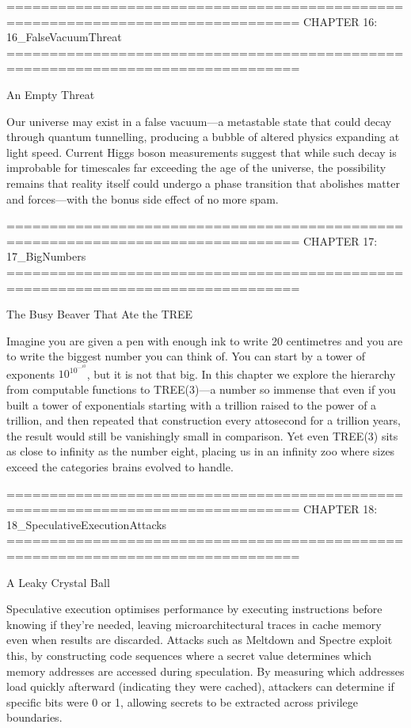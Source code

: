 ================================================================================
CHAPTER 16: 16_FalseVacuumThreat
================================================================================

An Empty Threat

Our universe may exist in a false vacuum—a metastable state that could decay through quantum tunnelling, producing a bubble of altered physics expanding at light speed. Current Higgs boson measurements suggest that while such decay is improbable for timescales far exceeding the age of the universe, the possibility remains that reality itself could undergo a phase transition that abolishes matter and forces—with the bonus side effect of no more spam.


================================================================================
CHAPTER 17: 17_BigNumbers
================================================================================

The Busy Beaver That Ate the TREE

Imagine you are given a pen with enough ink to write 20 centimetres and you are to write the biggest number you can think of. You can start by a tower of exponents $10^{10^{\cdots^{10}}}$, but it is not that big. In this chapter we explore the hierarchy from computable functions to TREE(3)—a number so immense that even if you built a tower of exponentials starting with a trillion raised to the power of a trillion, and then repeated that construction every attosecond for a trillion years, the result would still be vanishingly small in comparison. Yet even TREE(3) sits as close to infinity as the number eight, placing us in an infinity zoo where sizes exceed the categories brains evolved to handle.


================================================================================
CHAPTER 18: 18_SpeculativeExecutionAttacks
================================================================================

A Leaky Crystal Ball

Speculative execution optimises performance by executing instructions before knowing if they're needed, leaving microarchitectural traces in cache memory even when results are discarded. Attacks such as Meltdown and Spectre exploit this, by constructing code sequences where a secret value determines which memory addresses are accessed during speculation. By measuring which addresses load quickly afterward (indicating they were cached), attackers can determine if specific bits were 0 or 1, allowing secrets to be extracted across privilege boundaries.


